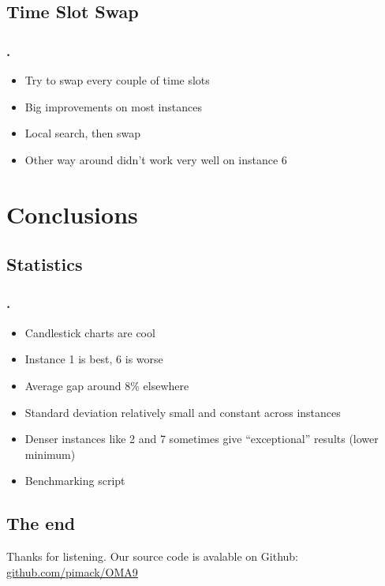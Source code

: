 \documentclass{beamer}
\begin{document}
\subsection{Time Slot Swap}

\begin{frame}
\frametitle{\thesection.\thesubsection \ \insertsubsection}
\begin{itemize}
	\item Try to swap every couple of time slots %
	\item Big improvements on most instances
	\item Local search, then swap
	\item Other way around didn't work very well on instance 6
\end{itemize}
\end{frame}

\section{Conclusions}

\subsection{Statistics}

\begin{frame}
\frametitle{\thesection.\thesubsection \ \insertsubsection}
\begin{itemize}
	\item Candlestick charts are cool
	\item Instance 1 is best, 6 is worse
	\item Average gap around 8\% elsewhere
	\item Standard deviation relatively small and constant across instances
	\item Denser instances like 2 and 7 sometimes give ``exceptional'' results (lower minimum)
	\item Benchmarking script
\end{itemize}
\end{frame}

\subsection{The end}

\begin{frame}
Thanks for listening.
\vfill
Our source code is avalable on Github: \href{https://github.com/pimack/OMA9}{github.com/pimack/OMA9}
\end{frame}
\end{document}
